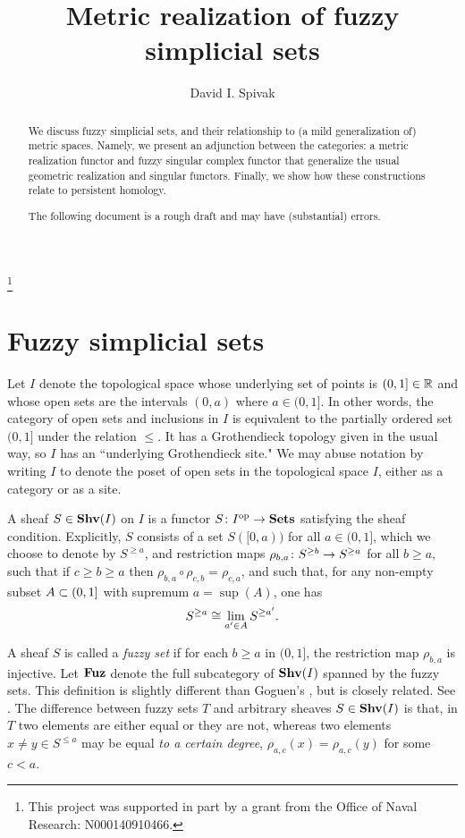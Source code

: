 \documentclass{amsart}
\def\Shv{\She}
\def\Fuz{{\bf Fuz}}
\begin{document}
\begin{abstract}

We discuss fuzzy simplicial sets, and their relationship to (a mild generalization of) metric spaces.  Namely, we present an adjunction between the categories: a metric realization functor and fuzzy singular complex functor that generalize the usual geometric realization and singular functors.  Finally, we show how these constructions relate to persistent homology.

The following document is a rough draft and may have (substantial) errors.

\end{abstract}

\title{Metric realization of fuzzy simplicial sets}

\author{David I. Spivak}

\thanks{This project was supported in part by a grant from the Office of Naval Research: N000140910466.}

\maketitle

\section{Fuzzy simplicial sets}

Let $I$ denote the topological space whose underlying set of points is $(0,1]\in\RR$ and whose open sets are the intervals $(0,a)$ where $a\in(0,1]$.  In other words, the category of open sets and inclusions in $I$ is equivalent to the partially ordered set $(0,1]$ under the relation $\leq$.  It has a Grothendieck topology given in the usual way, so $I$ has an ``underlying Grothendieck site."  We may abuse notation by writing $I$ to denote the poset of open sets in the topological space $I$, either as a category or as a site.

A sheaf $S\in\Shv(I)$ on $I$ is a functor $S\taking I\op\to\Sets$ satisfying the sheaf condition.  Explicitly, $S$ consists of a set $S([0,a))$ for all $a\in(0,1]$, which we choose to denote by $S^{\geq a}$,  and restriction maps $\rho_{b,a}\taking S^{\geq b}\to S^{\geq a}$ for all $b\geq a$, such that if $c\geq b\geq a$ then $\rho_{b,a}\circ\rho_{c,b}=\rho_{c,a}$, and such that, for any non-empty subset $A\ss(0,1]$ with supremum $a=\sup(A)$, one has $$S^{\geq a}\iso\lim_{a'\in A}S^{\geq a'}.$$

A sheaf $S$ is called a {\em fuzzy set} if for each $b\geq a$ in $(0,1]$, the restriction map $\rho_{b,a}$ is injective.  Let $\Fuz$ denote the full subcategory of $\Shv(I)$ spanned by the fuzzy sets.  This definition is slightly different than Goguen's \cite{Gog}, but is closely related.  See \cite{Bar}.  The difference between fuzzy sets $T$ and arbitrary sheaves $S\in\Shv(I)$ is that, in $T$ two elements are either equal or they are not, whereas two elements $x\neq y\in S^{\leq a}$ may be equal {\em to a certain degree}, $\rho_{a,c}(x)=\rho_{a,c}(y)$ for some $c<a$.
\end{document}
